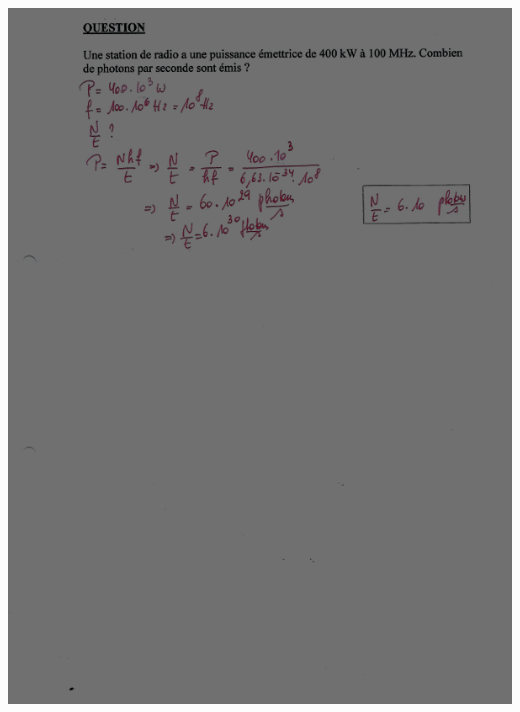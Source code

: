 {\includegraphics[width=17.448cm,height=24.063cm]{Pictures/10000001000002570000033B23A9DDE6A8AAA6C6.png}

}
